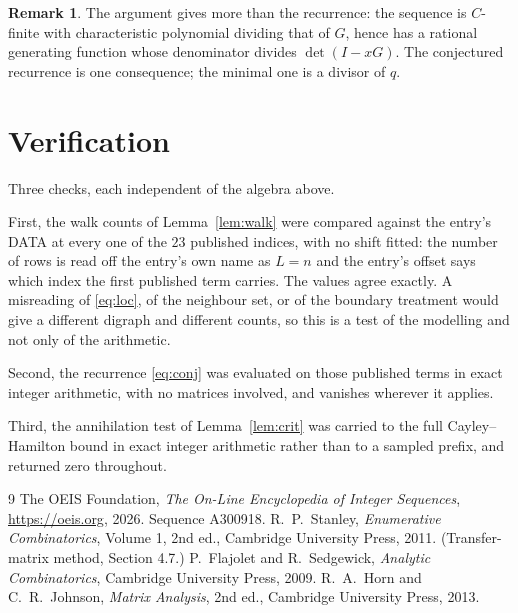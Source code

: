 \documentclass[11pt,a4paper]{article}
\theoremstyle{plain}
\theoremstyle{definition}
\newtheorem{remark}[theorem]{Remark}
\begin{document}
\begin{remark}
The argument gives more than the recurrence: the sequence is $C$-finite with characteristic
polynomial dividing that of $G$, hence has a rational generating function whose denominator
divides $\det(I-xG)$. The conjectured recurrence is one consequence; the minimal one is a
divisor of $q$.
\end{remark}

\section{Verification}

Three checks, each independent of the algebra above.

First, the walk counts of Lemma~\ref{lem:walk} were compared against the entry's DATA at
every one of the $23$ published indices, with no shift fitted: the number of rows is
read off the entry's own name as $L=n$ and the entry's offset says which index the first
published term carries. The values agree exactly. A misreading of \eqref{eq:loc}, of the
neighbour set, or of the boundary treatment would give a different digraph and different
counts, so this is a test of the modelling and not only of the arithmetic.

Second, the recurrence \eqref{eq:conj} was evaluated on those published terms in exact
integer arithmetic, with no matrices involved, and vanishes wherever it applies.

Third, the annihilation test of Lemma~\ref{lem:crit} was carried to the full
Cayley--Hamilton bound in exact integer arithmetic rather than to a sampled prefix, and
returned zero throughout.

\begin{thebibliography}{9}
 The OEIS Foundation, \emph{The On-Line Encyclopedia of Integer
Sequences}, \url{https://oeis.org}, 2026. Sequence A300918.
 R.~P.~Stanley, \emph{Enumerative Combinatorics}, Volume 1, 2nd ed.,
Cambridge University Press, 2011. (Transfer-matrix method, Section 4.7.)
 P.~Flajolet and R.~Sedgewick, \emph{Analytic Combinatorics}, Cambridge
University Press, 2009.
 R.~A.~Horn and C.~R.~Johnson, \emph{Matrix Analysis}, 2nd ed., Cambridge
University Press, 2013.
\end{thebibliography}
\end{document}
